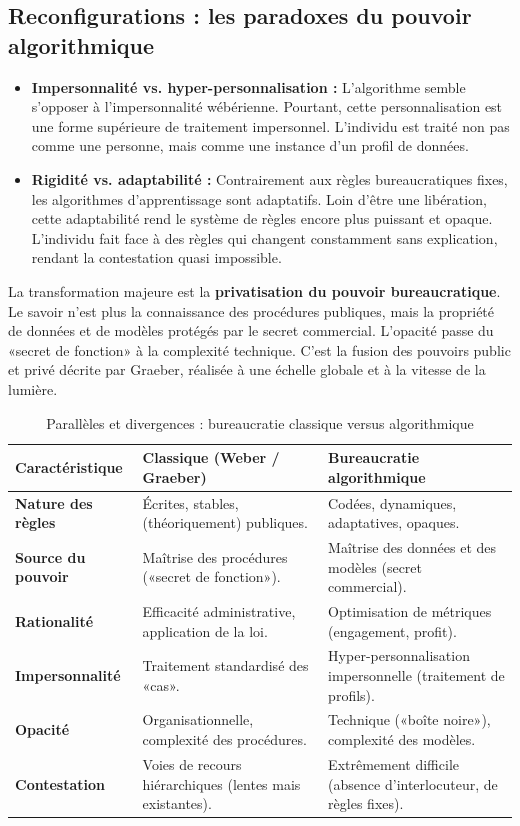 \subsection{Reconfigurations : les paradoxes du pouvoir algorithmique}
\begin{itemize}[label=\textbullet]
    \item \textbf{Impersonnalité vs. hyper-personnalisation :} L'algorithme semble s'opposer à l'impersonnalité wébérienne. Pourtant, cette personnalisation est une forme supérieure de traitement impersonnel. L'individu est traité non pas comme une personne, mais comme une instance d'un profil de données.
    \item \textbf{Rigidité vs. adaptabilité :} Contrairement aux règles bureaucratiques fixes, les algorithmes d'apprentissage sont adaptatifs. Loin d'être une libération, cette adaptabilité rend le système de règles encore plus puissant et opaque. L'individu fait face à des règles qui changent constamment sans explication, rendant la contestation quasi impossible.
\end{itemize}
La transformation majeure est la \textbf{privatisation du pouvoir bureaucratique}. Le savoir n'est plus la connaissance des procédures publiques, mais la propriété de données et de modèles protégés par le secret commercial. L'opacité passe du «secret de fonction» à la complexité technique. C'est la fusion des pouvoirs public et privé décrite par Graeber, réalisée à une échelle globale et à la vitesse de la lumière.

\begin{table}[ht]
\centering
\renewcommand{\tablename}{Tableau} 
\caption{Parallèles et divergences : bureaucratie classique versus algorithmique}
\label{tab:bureau_comp}
\begin{tabular}{@{}p{}p{}p{}@{}}
\toprule
\textbf{Caractéristique} & \textbf{Classique (Weber / Graeber)} & \textbf{Bureaucratie algorithmique} \\ \midrule
\textbf{Nature des règles} & Écrites, stables, (théoriquement) publiques. & Codées, dynamiques, adaptatives, opaques. \\
\textbf{Source du pouvoir} & Maîtrise des procédures («secret de fonction»). & Maîtrise des données et des modèles (secret commercial). \\
\textbf{Rationalité} & Efficacité administrative, application de la loi. & Optimisation de métriques (engagement, profit). \\
\textbf{Impersonnalité} & Traitement standardisé des «cas». & Hyper-personnalisation impersonnelle (traitement de profils). \\
\textbf{Opacité} & Organisationnelle, complexité des procédures. & Technique («boîte noire»), complexité des modèles. \\
\textbf{Contestation} & Voies de recours hiérarchiques (lentes mais existantes). & Extrêmement difficile (absence d'interlocuteur, de règles fixes). \\ \bottomrule
\end{tabular}
\end{table}

